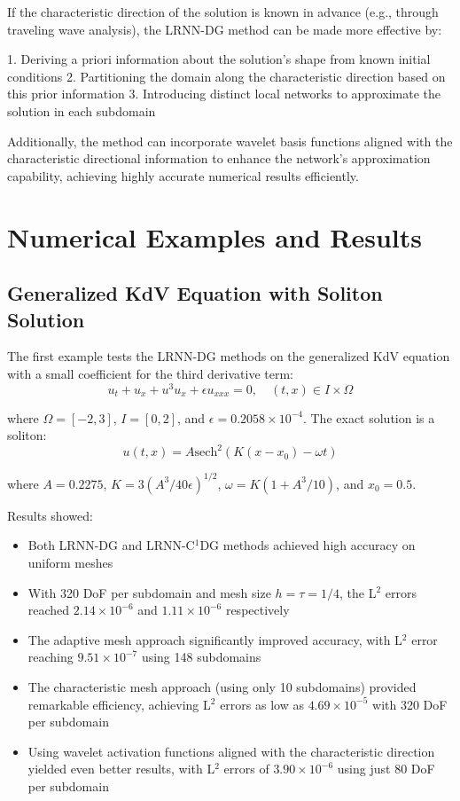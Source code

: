 \documentclass[11pt,a4paper]{article}
\begin{document}
If the characteristic direction of the solution is known in advance (e.g., through traveling wave analysis), the LRNN-DG method can be made more effective by:

1. Deriving a priori information about the solution's shape from known initial conditions
2. Partitioning the domain along the characteristic direction based on this prior information
3. Introducing distinct local networks to approximate the solution in each subdomain

Additionally, the method can incorporate wavelet basis functions aligned with the characteristic directional information to enhance the network's approximation capability, achieving highly accurate numerical results efficiently.

\section{Numerical Examples and Results}

\subsection{Generalized KdV Equation with Soliton Solution}

The first example tests the LRNN-DG methods on the generalized KdV equation with a small coefficient for the third derivative term:
\begin{equation}
u_t + u_x + u^3 u_x + \epsilon u_{xxx} = 0, \quad (t, x) \in I \times \Omega
\end{equation}

where $\Omega = [-2, 3]$, $I = [0, 2]$, and $\epsilon = 0.2058 \times 10^{-4}$. The exact solution is a soliton:
\begin{equation}
u(t, x) = A \text{sech}^2(K(x - x_0) - \omega t)
\end{equation}

where $A = 0.2275$, $K = 3(A^3/40\epsilon)^{1/2}$, $\omega = K(1 + A^3/10)$, and $x_0 = 0.5$.

Results showed:
\begin{itemize}
    \item Both LRNN-DG and LRNN-C$^1$DG methods achieved high accuracy on uniform meshes
    \item With 320 DoF per subdomain and mesh size $h = \tau = 1/4$, the L$^2$ errors reached $2.14 \times 10^{-6}$ and $1.11 \times 10^{-6}$ respectively
    \item The adaptive mesh approach significantly improved accuracy, with L$^2$ error reaching $9.51 \times 10^{-7}$ using 148 subdomains
    \item The characteristic mesh approach (using only 10 subdomains) provided remarkable efficiency, achieving L$^2$ errors as low as $4.69 \times 10^{-5}$ with 320 DoF per subdomain
    \item Using wavelet activation functions aligned with the characteristic direction yielded even better results, with L$^2$ errors of $3.90 \times 10^{-6}$ using just 80 DoF per subdomain
\end{itemize}
\end{document}

